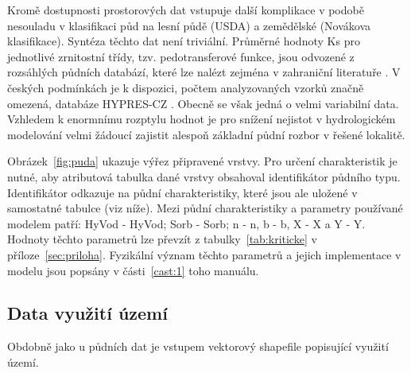 Kromě dostupnosti prostorových dat vstupuje další komplikace v podobě nesouladu v klasifikaci půd na lesní půdě (USDA) a zemědělské (Novákova klasifikace). Syntéza těchto dat není triviální.
Průměrné hodnoty \acs{Ks} pro jednotlivé zrnitostní třídy, tzv. pedotransferové funkce, jsou odvozené z rozsáhlých půdních databází, které lze nalézt zejména v zahraniční literatuře \citep{wosten1999, toth2015}. V českých podmínkách je k dispozici, počtem analyzovaných vzorků značně omezená, databáze HYPRES-CZ \citep{mihalikova2013}. Obecně se však jedná o velmi variabilní data. Vzhledem k enormnímu rozptylu hodnot je pro snížení nejistot v hydrologickém modelování velmi žádoucí zajistit alespoň základní půdní rozbor v řešené lokalitě.


Obrázek~\ref{fig:puda} ukazuje výřez připravené vrstvy. Pro určení charakteristik je nutné, aby atributová tabulka dané vrstvy obsahoval identifikátor půdního typu. Identifikátor odkazuje na půdní charakteristiky, které jsou ale uložené v samostatné tabulce (viz níže). Mezi půdní charakteristiky a parametry používané modelem patří: \acs{HyVod} - \acl{HyVod}; \acs{Sorb} - \acl{Sorb}; \acs{n} - \acl{n}, \acs{b} - \acl{b}, \acs{X} - \acl{X} a  \acs{Y} - \acl{Y}. Hodnoty těchto parametrů lze převzít z tabulky~\ref{tab:kriticke} v příloze~\ref{sec:priloha}. Fyzikální význam těchto parametrů a jejich implementace v modelu jsou popsány v části~\ref{cast:1} toho manuálu. 





 
 
 
 
 
 
 
 
 
 
\subsection{Data využití území} \label{sec:vstupvegetace}
Obdobně jako u půdních dat je vstupem vektorový shapefile popisující využití území.

